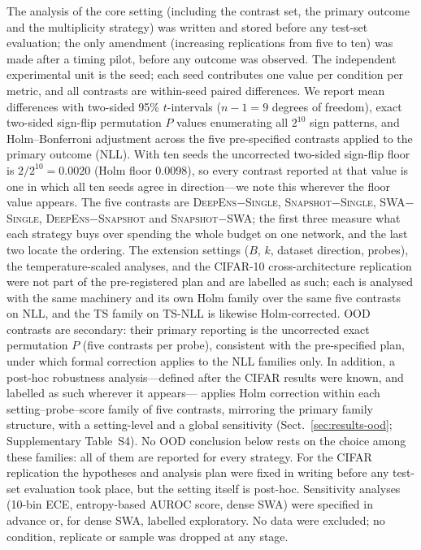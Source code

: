 \documentclass[11pt,a4paper]{article}
\newcommand{\deepens}{\textsc{DeepEns}}
\newcommand{\snapshot}{\textsc{Snapshot}}
\newcommand{\swa}{\textsc{SWA}}
\newcommand{\single}{\textsc{Single}}
\newcommand{\ts}{\textsc{TS}}
\begin{document}
The analysis of the core setting (including the contrast set, the primary
outcome and the multiplicity strategy) was written and stored before any
test-set evaluation; the only amendment (increasing replications from five
to ten) was made after a timing pilot, before any outcome was observed.
The independent experimental unit is the seed; each seed contributes one
value per condition per metric, and all contrasts are within-seed paired
differences. We report mean differences with two-sided 95\% $t$-intervals
($n-1=9$ degrees of freedom), exact two-sided sign-flip permutation $P$
values enumerating all $2^{10}$ sign patterns, and Holm--Bonferroni
adjustment across the five pre-specified contrasts applied to the primary
outcome (NLL). With ten seeds the uncorrected two-sided sign-flip floor is
$2/2^{10}=0.0020$ (Holm floor 0.0098), so every contrast reported at that
value is one in which all ten seeds agree in direction---we note this
wherever the floor value appears. The five contrasts are \deepens$-$\single,
\snapshot$-$\single, \swa$-$\single, \deepens$-$\snapshot{} and
\snapshot$-$\swa{}; the first three measure what each strategy buys over
spending the whole budget on one network, and the last two locate the
ordering. The extension settings ($B$, $k$, dataset direction, probes), the
temperature-scaled analyses, and the CIFAR-10 cross-architecture
replication were not part of the pre-registered plan and are labelled as
such; each is analysed with the same machinery and its own Holm family over
the same five contrasts on NLL, and the \ts{} family on \ts-NLL is likewise
Holm-corrected. OOD contrasts are secondary: their primary reporting is the
uncorrected exact permutation $P$ (five contrasts per probe), consistent with
the pre-specified plan, under which formal correction applies to the NLL
families only. In addition, a post-hoc robustness analysis---defined after
the CIFAR results were known, and labelled as such wherever it appears---
applies Holm correction within each setting--probe--score family of five
contrasts, mirroring the primary family structure, with a setting-level and
a global sensitivity (Sect.~\ref{sec:results-ood}; Supplementary
Table~S4). No OOD conclusion below rests on the choice among these
families: all of them are reported for every strategy. For the CIFAR replication the hypotheses and analysis plan
were fixed in writing before any test-set evaluation took place, but the
setting itself is post-hoc. Sensitivity analyses (10-bin ECE, entropy-based
AUROC score, dense \swa{}) were specified in advance or, for dense \swa{},
labelled exploratory. No data were excluded; no condition, replicate or
sample was dropped at any stage.
\end{document}
